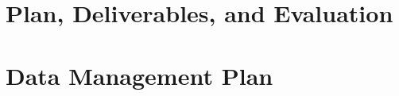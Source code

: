 \documentclass[10pt]{article}
\begin{document}

\newpage
\setcounter{page}{1}



%




%


%
%









%



%
%



%

\section{Plan, Deliverables, and Evaluation}






\newpage
\setlength{\itemsep}{0pt}
\setcounter{page}{1}

\section*{Data Management Plan}


\newpage
\setlength{\itemsep}{0pt}
\setcounter{page}{1}



\end{document}
